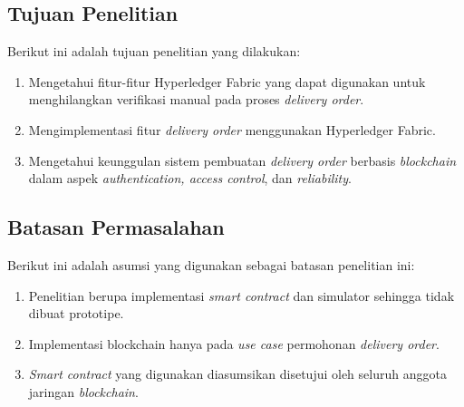 \subsection{Tujuan Penelitian}
\label{sec:tujuan}
Berikut ini adalah tujuan penelitian yang dilakukan:
\begin{enumerate}
	\item Mengetahui fitur-fitur Hyperledger Fabric yang dapat digunakan untuk menghilangkan verifikasi manual pada proses \textit{delivery order}.
	\item Mengimplementasi fitur \textit{delivery order} menggunakan Hyperledger Fabric.
	\item Mengetahui keunggulan sistem pembuatan \textit{delivery order} berbasis \textit{blockchain} dalam aspek \textit{authentication, access control}, dan \textit{reliability}.
\end{enumerate}


\subsection{Batasan Permasalahan}
\label{sec:batasanMasalah}
Berikut ini adalah asumsi yang digunakan sebagai batasan penelitian ini:
\begin{enumerate}
	\item Penelitian berupa implementasi \textit{smart contract} dan simulator sehingga tidak dibuat prototipe.
	\item Implementasi blockchain hanya pada \textit{use case} permohonan \textit{delivery order}.
	\item \textit{Smart contract} yang digunakan diasumsikan disetujui oleh seluruh anggota jaringan \textit{blockchain}.

\end{enumerate}


